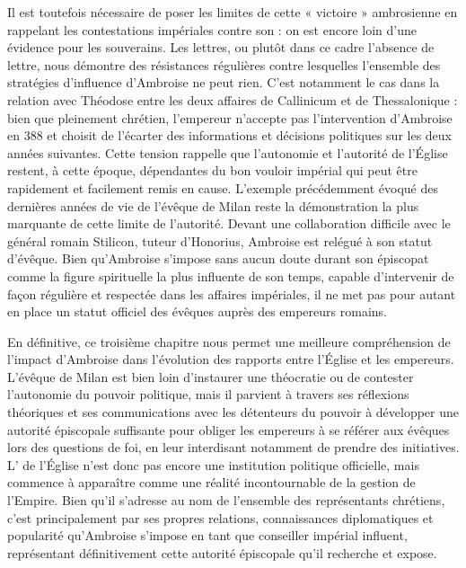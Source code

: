 \bigskip

Il est toutefois nécessaire de poser les limites de cette « victoire » ambrosienne en rappelant les contestations impériales contre son  : on est encore loin d'une évidence pour les souverains. Les lettres, ou plutôt dans ce cadre l'absence de lettre, nous démontre des résistances régulières contre lesquelles l'ensemble des stratégies d'influence d'Ambroise ne peut rien. C'est notamment le cas dans la relation avec Théodose entre les deux affaires de Callinicum et de Thessalonique : bien que pleinement chrétien, l'empereur n'accepte pas l'intervention d'Ambroise en 388 et choisit de l'écarter des informations et décisions politiques sur les deux années suivantes. Cette tension rappelle que l'autonomie et l'autorité de l'Église restent, à cette époque, dépendantes du bon vouloir impérial qui peut être rapidement et facilement remis en cause. L'exemple précédemment évoqué des dernières années de vie de l'évêque de Milan reste la démonstration la plus marquante de cette limite de l'autorité. Devant une collaboration difficile avec le général romain Stilicon, tuteur d'Honorius, Ambroise est relégué à son statut d'évêque. Bien qu'Ambroise s'impose sans aucun doute durant son épiscopat comme la figure spirituelle la plus influente de son temps, capable d'intervenir de façon régulière et respectée dans les affaires impériales, il ne met pas pour autant en place un statut officiel des évêques auprès des empereurs romains.

\bigskip

En définitive, ce troisième chapitre nous permet une meilleure compréhension de l'impact d'Ambroise dans l'évolution des rapports entre l'Église et les empereurs. L'évêque de Milan est bien loin d'instaurer une théocratie ou de contester l'autonomie du pouvoir politique, mais il parvient à travers ses réflexions théoriques et ses communications avec les détenteurs du pouvoir à développer une autorité épiscopale suffisante pour obliger les empereurs à se référer aux évêques lors des questions de foi, en leur interdisant notamment de prendre des initiatives. L' de l'Église n'est donc pas encore une institution politique officielle, mais commence à apparaître comme une réalité incontournable de la gestion de l'Empire. Bien qu'il s'adresse au nom de l'ensemble des représentants chrétiens, c'est principalement par ses propres relations, connaissances diplomatiques et popularité qu'Ambroise s'impose en tant que conseiller impérial influent, représentant définitivement cette autorité épiscopale qu'il recherche et expose.
